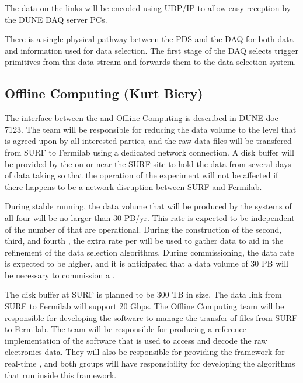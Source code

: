 The data on the links will be encoded using UDP/IP to allow easy
reception by the DUNE DAQ server PCs.

There is a single physical pathway between the PDS and the DAQ for
both data and information used for data selection. The first stage of
the DAQ selects trigger primitives from this data stream and forwards
them to the data selection system.

\subsection{Offline Computing (Kurt Biery)}
\label{sec:fdsp-daq-intfc-fnal-cmptg}

The interface between the  and Offline Computing is described in
DUNE-doc-7123. The  team will be responsible for reducing the
data volume to the level that is agreed upon by all interested parties,
and the raw data files will be transfered from SURF to Fermilab using
a dedicated network connection. A disk buffer will be provided by the
 on or near the SURF site to hold the data from several days
of data taking so that the operation of the experiment will not be affected
if there happens to be a network disruption between SURF and Fermilab.

During stable running, the data volume that will be produced by the
 systems of all four  will be no larger
than 30 PB/yr. This rate is expected to be independent of the number
of  that are operational. During the construction
of the second, third, and fourth , the extra rate
per  will be used to gather data to aid in the
refinement of the data selection algorithms.
During commissioning, the data rate is expected to  be higher,
and it is anticipated that a data volume
of 30 PB will be necessary to commission a .

The disk buffer at SURF is planned to be 300 TB in size.  The data
link from SURF to Fermilab will support 20 Gbps.  The Offline Computing
team will be responsible for developing the software to manage the
transfer of files from SURF to Fermilab. The  team will be
responsible for producing a
reference implementation of the software that is used to access and
decode the raw electronics data. They will also be responsible for
providing the framework for real-time , and
both groups will have responsibility for developing the 
algorithms that run inside this framework.

